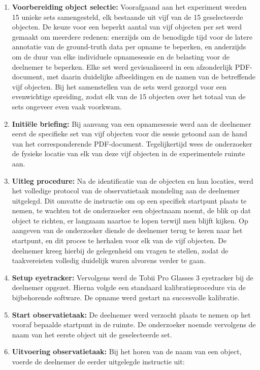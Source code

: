 \begin{enumerate}
  \item \textbf{Voorbereiding object selectie:} Voorafgaand aan het experiment werden 15 unieke sets samengesteld, 
  elk bestaande uit vijf van de 15 geselecteerde objecten. 
  De keuze voor een beperkt aantal van vijf objecten per set werd gemaakt om meerdere redenen: 
  enerzijds om de benodigde tijd voor de latere annotatie van de ground-truth data per opname te beperken, 
  en anderzijds om de duur van elke individuele opnamesessie en de belasting voor de deelnemer te beperken.
  Elke set werd gevisualiseerd in een afzonderlijk PDF-document, met daarin duidelijke 
  afbeeldingen en de namen van de betreffende vijf objecten. 
  Bij het samenstellen van de sets werd gezorgd voor een evenwichtige spreiding, 
  zodat elk van de 15 objecten over het totaal van de sets ongeveer even vaak voorkwam.
  \item \textbf{Initiële briefing:} Bij aanvang van een opnamesessie werd aan de deelnemer eerst de specifieke 
  set van vijf objecten voor die sessie getoond aan de hand van het corresponderende PDF-document. 
  Tegelijkertijd wees de onderzoeker de fysieke locatie van elk van deze vijf objecten in de experimentele ruimte aan.
  \item \textbf{Uitleg procedure:} Na de identificatie van de objecten en hun locaties, 
  werd het volledige protocol van de observatietaak mondeling aan de deelnemer uitgelegd. 
  Dit omvatte de instructie om op een specifiek startpunt plaats te nemen, te wachten tot de onderzoeker een objectnaam noemt, 
  de blik op dat object te richten, er langzaam naartoe te lopen terwijl men blijft kijken. Op aangeven van de onderzoeker diende de deelnemer terug te keren naar het startpunt, 
  en dit proces te herhalen voor elk van de vijf objecten. 
  De deelnemer kreeg hierbij de gelegenheid om vragen te stellen, zodat de taakvereisten volledig duidelijk waren alvorens verder te gaan.
  \item \textbf{Setup eyetracker:} Vervolgens werd de Tobii Pro Glasses 3 eyetracker bij de deelnemer opgezet. 
  Hierna volgde een standaard kalibratieprocedure via de bijbehorende software. 
  De opname werd gestart na succesvolle kalibratie.
  \item \textbf{Start observatietaak:} De deelnemer werd verzocht plaats te nemen op het vooraf bepaalde startpunt in de ruimte. 
  De onderzoeker noemde vervolgens de naam van het eerste object uit de geselecteerde set.
  \item \textbf{Uitvoering observatietaak:} Bij het horen van de naam van een object, voerde de deelnemer de eerder uitgelegde instructie uit: 

\end{enumerate}
